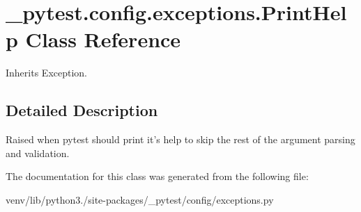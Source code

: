 \hypertarget{class__pytest_1_1config_1_1exceptions_1_1_print_help}{}\section{\+\_\+pytest.\+config.\+exceptions.\+Print\+Help Class Reference}
\label{class__pytest_1_1config_1_1exceptions_1_1_print_help}


Inherits Exception.



\subsection{Detailed Description}
\begin{DoxyVerb}Raised when pytest should print it's help to skip the rest of the
argument parsing and validation.\end{DoxyVerb}
 

The documentation for this class was generated from the following file\+:\begin{DoxyCompactItemize}
\item 
venv/lib/python3./site-\/packages/\+\_\+pytest/config/exceptions.\+py\end{DoxyCompactItemize}
